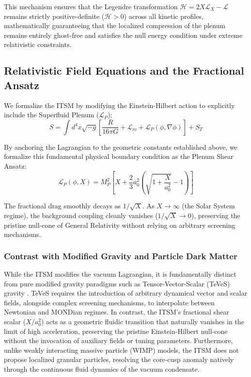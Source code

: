 \documentclass[aps,prd,10pt,twocolumn,superscriptaddress,nofootinbib,floatfix]{revtex4-2}
\begin{document}
This mechanism ensures that the Legendre transformation $\mathcal{H} = 2X\mathcal{L}_X - \mathcal{L}$ remains strictly positive-definite ($\mathcal{H} > 0$) across all kinetic profiles, mathematically guaranteeing that the localized compression of the plenum remains entirely ghost-free and satisfies the null energy condition under extreme relativistic constraints.

\subsection{Relativistic Field Equations and the Fractional Ansatz}
We formalize the ITSM by modifying the Einstein-Hilbert action to explicitly include the Superfluid Plenum ($\mathcal{L}_P$):
\begin{equation}
S = \int d^4x \sqrt{-g} \left[ \frac{R}{16\pi G} + \mathcal{L}_m + \mathcal{L}_P(\phi, \nabla\phi) \right] + S_T
\end{equation}

By anchoring the Lagrangian to the geometric constants established above, we formalize this fundamental physical boundary condition as the Plenum Shear Ansatz:
\begin{equation} \label{eq:plenum_shear_ansatz}
\mathcal{L}_P(\phi, X) = M_P^2 \left[ X + \frac{2}{3}a_0^2 \left(\sqrt{1+\frac{X}{a_0^2}} - 1 \right) \right]
\end{equation}

The fractional drag smoothly decays as $1/\sqrt{X}$. As $X \rightarrow \infty$ (the Solar System regime), the background coupling cleanly vanishes ($1/\sqrt{X} \rightarrow 0$), preserving the pristine null-cone of General Relativity without relying on arbitrary screening mechanisms.

\subsubsection{Contrast with Modified Gravity and Particle Dark Matter}
While the ITSM modifies the vacuum Lagrangian, it is fundamentally distinct from pure modified gravity paradigms such as Tensor-Vector-Scalar (TeVeS) gravity \cite{teves}. TeVeS requires the introduction of arbitrary dynamical vector and scalar fields, alongside complex screening mechanisms, to interpolate between Newtonian and MONDian regimes. In contrast, the ITSM's fractional shear scalar ($X/a_0^2$) acts as a geometric fluidic transition that naturally vanishes in the limit of high acceleration, preserving the pristine Einstein-Hilbert null-cone without the invocation of auxiliary fields or tuning parameters. Furthermore, unlike weakly interacting massive particle (WIMP) models, the ITSM does not propose localized granular particles, resolving the core-cusp anomaly natively through the continuous fluid dynamics of the vacuum condensate.
\end{document}
